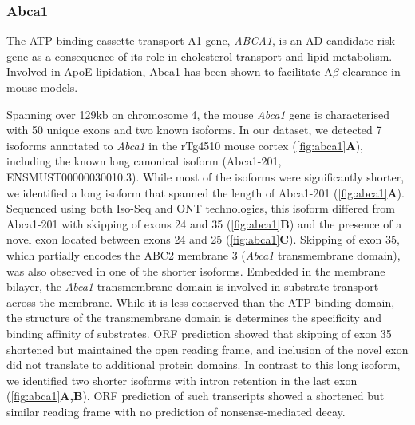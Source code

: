 \clearpage
\subsubsection{Abca1}
The ATP-binding cassette transport A1 gene, \textit{ABCA1}, is an AD candidate risk gene as a consequence of its role in cholesterol transport and lipid metabolism\cite{Nordestgaard2015}. Involved in ApoE lipidation, Abca1 has been shown to facilitate A$\beta$ clearance in mouse models\cite{Fitz2012}. 

Spanning over 129kb on chromosome 4, the mouse \textit{Abca1} gene is characterised with 50 unique exons and two known isoforms. In our dataset, we detected 7 isoforms annotated to \textit{Abca1} in the rTg4510 mouse cortex (\cref{fig:abca1}\textbf{A}), including the known long canonical isoform (Abca1-201, ENSMUST00000030010.3). While most of the isoforms were significantly shorter, we identified a long isoform that spanned the length of Abca1-201 (\cref{fig:abca1}\textbf{A}). Sequenced using both Iso-Seq and ONT technologies, this isoform differed from Abca1-201 with skipping of exons 24 and 35 (\cref{fig:abca1}\textbf{B}) and the presence of a novel exon located between exons 24 and 25 (\cref{fig:abca1}\textbf{C}). Skipping of exon 35, which partially encodes the ABC2 membrane 3 (\textit{Abca1} transmembrane domain), was also observed in one of the shorter isoforms. Embedded in the membrane bilayer, the \textit{Abca1} transmembrane domain is involved in substrate transport across the membrane. While it is less conserved than the ATP-binding domain, the structure of the transmembrane domain is determines the specificity and binding affinity of substrates. ORF prediction showed that skipping of exon 35 shortened but maintained the open reading frame, and inclusion of the novel exon did not translate to additional protein domains. In contrast to this long isoform, we identified two shorter isoforms with intron retention in the last exon (\cref{fig:abca1}\textbf{A,B}). ORF prediction of such transcripts showed a shortened but similar reading frame with no prediction of nonsense-mediated decay. 

